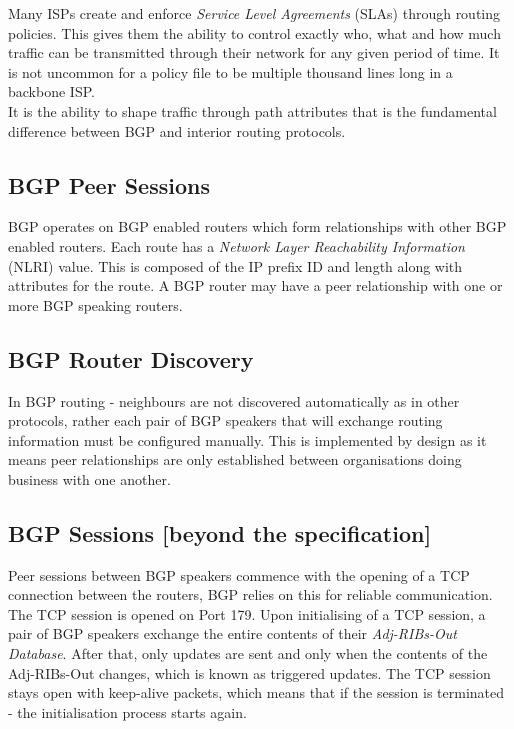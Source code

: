 Many ISPs create and enforce \textit{Service Level Agreements} (SLAs) through routing policies. This gives them the ability to control exactly who, what and how much traffic can be transmitted through their network for any given period of time. It is not uncommon for a policy file to be multiple thousand lines long in a backbone ISP.\\

It is the ability to shape traffic through path attributes that is the fundamental difference between BGP and interior routing protocols.

\subsection{BGP Peer Sessions}
BGP operates on BGP enabled routers which form relationships with other BGP enabled routers. Each route has a \textit{Network Layer Reachability Information} (NLRI) value. This is composed of the IP prefix ID and length along with attributes for the route. A BGP router may have a peer relationship with one or more BGP speaking routers. 

\subsection{BGP Router Discovery}
In BGP routing - neighbours are not discovered automatically as in other protocols, rather each pair of BGP speakers that will exchange routing information must be configured manually. This is implemented by design as it means peer relationships are only established between organisations doing business with one another.

\subsection{BGP Sessions [beyond the specification]}
Peer sessions between BGP speakers commence with the opening of a TCP connection between the routers, BGP relies on this for reliable communication. The TCP session is opened on Port 179. Upon initialising of a TCP session, a pair of BGP speakers exchange the entire contents of their \textit{Adj-RIBs-Out Database}. After that, only updates are sent and only when the contents of the Adj-RIBs-Out changes, which is known as triggered updates. The TCP session stays open with keep-alive packets, which means that if the session is terminated - the initialisation process starts again. 

